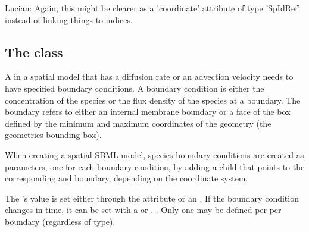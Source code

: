 {\color{red} Lucian: \notice Again, this might be clearer as a 'coordinate' attribute of type 'SpIdRef' instead of linking things to indices.}


\subsection{The  class}
\label{BoundaryCondition-class}
A \Species in a spatial model that has a diffusion rate or an advection velocity needs to have specified boundary conditions. A boundary condition is either the concentration of the species or the flux density of the species at a boundary.  The boundary refers to either an internal membrane boundary or a face of the box defined by the minimum and maximum coordinates of the geometry (the geometries bounding box).  

When creating a spatial SBML model, species boundary conditions are created as parameters, one for each boundary condition, by adding a child \BoundaryCondition that points to the corresponding \Species and boundary, depending on the coordinate system.





The \Parameter's value is set either through the  attribute or an \InitialAssignment.  If the boundary condition changes in time, it can be set with a \Rule or \Event.  .  Only one \BoundaryCondition may be defined per \Species per boundary (regardless of type).


